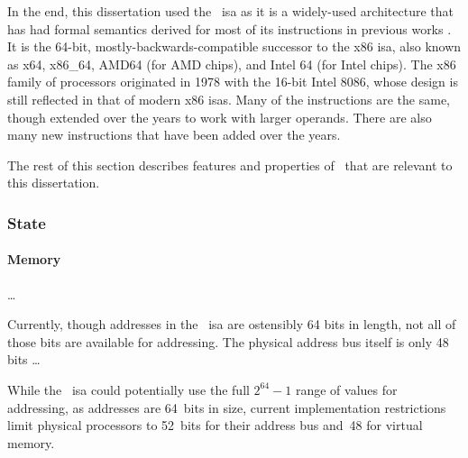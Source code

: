 In the end,
this dissertation used the \arch\ \ac{isa} as it is a widely-used architecture
that has had formal semantics derived for most of its instructions
in previous works \autocite{heule2016stratified,roessle2019}.
It is the 64-bit, mostly-backwards-compatible successor to the x86 \ac{isa},
also known as x64, x86\_64, AMD64 (for AMD chips), and Intel 64 (for Intel chips).
The x86 family of processors originated in 1978 with the 16-bit Intel 8086,
whose design is still reflected in that of modern x86 \acp{isa}.
Many of the instructions are the same,
though extended over the years to work with larger operands.
There are also many new instructions that have been added over the years.

The rest of this section describes features and properties of \arch\ that are relevant
to this dissertation.

\subsubsection{State}
\paragraph{Memory}
\todo\dots


Currently, though addresses in the \arch\ \ac{isa} are ostensibly 64 bits in length,
not all of those bits are available for addressing.
The physical address bus itself is only 48 bits
\todo\dots

While the \arch\ \ac{isa} could potentially use the full $2^{64}-1$
range of values for addressing, as addresses are 64~bits in size,
current implementation restrictions limit physical processors to
52~bits for their address bus and~48 for virtual memory.

